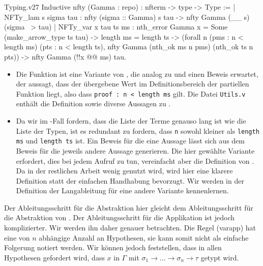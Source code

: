 \begin{code}[nfty]{Typing.v}{}{27}
Inductive nfty (Gamma : repo) : nfterm -> type -> Type :=
  | NFTy_lam s sigma tau : 
      nfty (sigma :: Gamma) s tau -> nfty Gamma (\__ s) (sigma ~> tau)
  | NFTy_var x tau ts ms : 
      nth_error Gamma x = Some (make_arrow_type ts tau) ->             
      length ms = length ts ->
      (forall n (pms : n < length ms) (pts : n < length ts),
         nfty Gamma (nth_ok ms n pms) (nth_ok ts n pts)) ->
      nfty Gamma (!!x @@ ms) tau.
\end{code}
\begin{remark}
    \begin{itemize}
        \item Die Funktion  ist eine Variante von , die analog zu  und  einen Beweis erwartet, der aussagt, dass der übergebene Wert im Definitionsbereich der partiellen Funktion liegt, also dass \texttt{proof : n < length ms} gilt. Die Datei \texttt{Utils.v} enthält die Definition sowie diverse Aussagen zu .
        \item Da wir im -Fall fordern, dass die Liste der Terme genauso lang ist wie die Liste der Typen, ist es redundant zu fordern, dass \texttt{n} sowohl kleiner als \texttt{length ms} und \texttt{length ts} ist. Ein Beweis für die eine Aussage lässt sich aus dem Beweis für die jeweils andere Aussage generieren. Die hier gewählte Variante erfordert, dies bei jedem Aufruf zu tun, vereinfacht aber die Definition von . Da  in der restlichen Arbeit wenig genutzt wird, wird hier eine klarere Definition statt der einfachen Handhabung bevorzugt. Wir werden in der Definition der Langableitung für  eine andere Variante kennenlernen.
    \end{itemize}
\end{remark}
Der Ableitungsschritt für die Abstraktion hier gleicht dem Ableitungsschritt für die Abstraktion von . Der Ableitungsschritt für die Applikation ist jedoch komplizierter. Wir werden ihn daher genauer betrachten. Die Regel (varapp) hat eine von $n$ abhängige Anzahl an Hypothesen, sie kann somit nicht als einfache Folgerung notiert werden. Wir können jedoch feststellen, dass in allen Hypothesen gefordert wird, dass $x$ in $\Gamma$ mit $\sigma_1 \to \ldots \to \sigma_n\to\tau$ getypt wird. 
